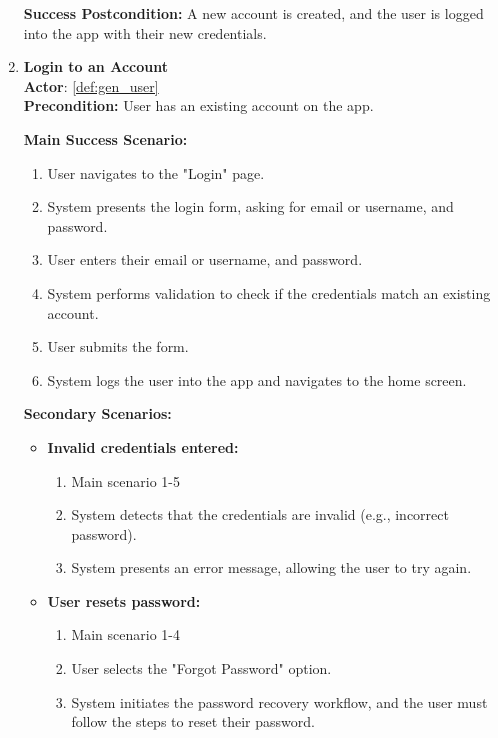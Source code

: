 \documentclass{article}
\begin{document}
\begin{enumerate}[label=\textbf{UC\arabic*}]
        \textbf{Success Postcondition:} A new account is created, and the user is logged into the app with their new credentials.

    \item \label{uc:24} \textbf{Login to an Account} \\
        \textbf{Actor}: \ref{def:gen_user} \\
        \textbf{Precondition:} User has an existing account on the app.
    
        \textbf{Main Success Scenario:}
        \begin{enumerate}[label=\textbf{\arabic*.}]
            \item User navigates to the "Login" page.
            \item System presents the login form, asking for email or username, and password.
            \item User enters their email or username, and password.
            \item System performs validation to check if the credentials match an existing account.
            \item User submits the form.
            \item System logs the user into the app and navigates to the home screen.
        \end{enumerate}
        
        \textbf{Secondary Scenarios:}
        \begin{itemize}
            \item[{}] \textbf{Invalid credentials entered:}
            \begin{enumerate}[label=\textbf{\arabic*.}]
                \item Main scenario 1-5
                \item System detects that the credentials are invalid (e.g., incorrect password).
                \item System presents an error message, allowing the user to try again.
            \end{enumerate}
            
            \item[{}] \textbf{User resets password:}
            \begin{enumerate}[label=\textbf{\arabic*.}]
                \item Main scenario 1-4
                \item User selects the "Forgot Password" option.
                \item System initiates the password recovery workflow, and the user must follow the steps to reset their password.
            \end{enumerate}
            

\end{itemize}
\end{enumerate}
\end{document}
